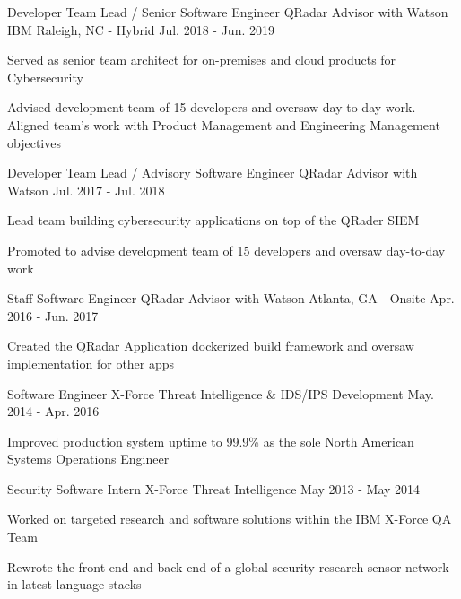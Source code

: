 \begin{cventries}
    \cventry
      {Developer Team Lead / Senior Software Engineer \enskip\textendash\enskip QRadar Advisor with Watson} %
      {IBM} %
      {Raleigh, NC - Hybrid} %
      {Jul. 2018 - Jun. 2019} %
      {
        \begin{cvitems}
          \item Served as senior team architect for on-premises and cloud products for Cybersecurity
          \item Advised development team of 15 developers and oversaw day-to-day work. Aligned team's work with Product Management and Engineering Management objectives
        \end{cvitems}
      }
      
    \cventry
      {Developer Team Lead / Advisory Software Engineer \enskip\textendash\enskip QRadar Advisor with Watson} %
      {} %
      {} %
      {Jul. 2017 - Jul. 2018} %
      {
        \begin{cvitems}
          \item Lead team building cybersecurity applications on top of the QRader SIEM
          \item Promoted to advise development team of 15 developers and oversaw day-to-day work
        \end{cvitems}
      }

    \cventry
      {Staff Software Engineer \enskip\textendash\enskip QRadar Advisor with Watson}
      {}
      {Atlanta, GA - Onsite} %
      {Apr. 2016 - Jun. 2017}
      {
        \begin{cvitems}
          \item Created the QRadar Application dockerized build framework and oversaw implementation for other apps
        \end{cvitems}
      }
              
    \cventry
      {Software Engineer \enskip\textendash\enskip X-Force Threat Intelligence \& IDS/IPS Development}
      {}
      {} %
      {May. 2014 - Apr. 2016}
      {
      \begin{cvitems}
        \item Improved production system uptime to 99.9\% as the sole North American Systems Operations Engineer
      \end{cvitems}
      }

    \cventry
      {Security Software Intern \enskip\textendash\enskip X-Force Threat Intelligence}
      {}
      {} %
      {May 2013 - May 2014}
      {
      \begin{cvitems}
        \item Worked on targeted research and software solutions within the IBM X-Force QA Team
        \item Rewrote the front-end and back-end of a global security research sensor network in latest language stacks
      \end{cvitems}
      }


\end{cventries}
